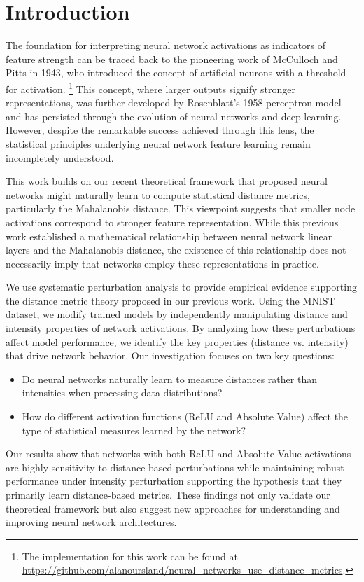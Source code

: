 \section{Introduction}

The foundation for interpreting neural network activations as indicators of feature strength can be traced back to the pioneering work of McCulloch and Pitts in 1943, who introduced the concept of artificial neurons with a threshold for activation. \footnote{The implementation for this work can be found at \url{https://github.com/alanoursland/neural_networks_use_distance_metrics}.} This concept, where larger outputs signify stronger representations, was further developed by Rosenblatt's 1958 perceptron model and has persisted through the evolution of neural networks and deep learning. However, despite the remarkable success achieved through this lens, the statistical principles underlying neural network feature learning remain incompletely understood. 

This work builds on our recent theoretical framework \cite{oursland2024interpreting} that proposed neural networks might naturally learn to compute statistical distance metrics, particularly the Mahalanobis distance. This viewpoint suggests that smaller node activations correspond to stronger feature representation. While this previous work established a mathematical relationship between neural network linear layers and the Mahalanobis distance, the existence of this relationship does not necessarily imply that networks employ these representations in practice. 

We use systematic perturbation analysis to provide empirical evidence supporting the distance metric theory proposed in our previous work. Using the MNIST dataset, we modify trained models by independently manipulating distance and intensity properties of network activations. By analyzing how these perturbations affect model performance, we identify the key properties (distance vs. intensity) that drive network behavior. Our investigation focuses on two key questions:

\begin{itemize}
    \item Do neural networks naturally learn to measure distances rather than intensities when processing data distributions?
    \item How do different activation functions (ReLU and Absolute Value) affect the type of statistical measures learned by the network?
\end{itemize}

Our results show that networks with both ReLU and Absolute Value activations are highly sensitivity to distance-based perturbations while maintaining robust performance under intensity perturbation supporting the hypothesis that they primarily learn distance-based metrics. These findings not only validate our theoretical framework but also suggest new approaches for understanding and improving neural network architectures.